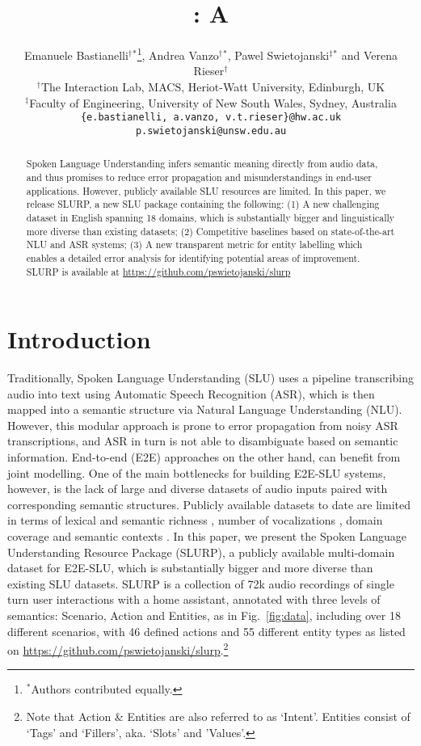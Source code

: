 \documentclass[11pt,a4paper]{article}
\title{\datasetacr: A \datasetname}
\author{Emanuele Bastianelli$^{\dagger}$$^*$\thanks{$^*$Authors contributed equally.}, 
  Andrea Vanzo$^{\dagger}$$^*$, 
  Pawel Swietojanski$^{\ddagger}$$^*$ and Verena Rieser$^\dagger$ \\
  $^\dagger$The Interaction Lab, MACS, Heriot-Watt University, Edinburgh, UK \\
  $^\ddagger$Faculty of Engineering, University of New South Wales, Sydney, Australia \\
  {\tt \{e.bastianelli, a.vanzo, v.t.rieser\}@hw.ac.uk} \\
  {\tt p.swietojanski@unsw.edu.au} \\
  }
\date{}
\newcommand{\datasetacr}{SLURP}
\newcommand{\datasetname}{Spoken Language Understanding Resource Package}
\newcommand{\etoe}{E2E}
\newcommand{\slu}{SLU}
\newcommand{\asr}{ASR}
\newcommand{\nlu}{NLU}
\newcommand{\datasetwholek}{72k}
\newcommand{\scenarion}{18}
\newcommand{\actionn}{46}
\newcommand{\entityn}{55}
\begin{document}
\maketitle
\begin{abstract}
Spoken Language Understanding infers semantic meaning directly from audio data, and thus promises to reduce error propagation and misunderstandings in end-user applications. However, publicly available SLU resources are limited. In this paper, we release \datasetacr, a new SLU package  containing the following: (1) A new challenging dataset in English spanning \scenarion{} domains, which is substantially bigger and linguistically more diverse than existing datasets; (2) Competitive baselines based on state-of-the-art NLU and ASR systems; (3)  A new transparent metric for entity labelling which enables a detailed error analysis for identifying potential areas of improvement. \datasetacr{} is available at \url{https://github.com/pswietojanski/slurp}
\end{abstract}
\section{Introduction}


Traditionally, Spoken Language Understanding (\slu) 
uses a pipeline transcribing audio into text using Automatic Speech Recognition (\asr), which is then mapped
into a semantic structure via Natural Language Understanding (\nlu). 
However, this modular approach is prone to error propagation from noisy \asr{} transcriptions, and \asr{} in turn is not able to disambiguate based on semantic information. End-to-end (\etoe) approaches on the other hand, can benefit from joint modelling.
One of the main bottlenecks for building \etoe-\slu{} systems, however, is the lack of large and diverse datasets
of audio inputs paired with corresponding semantic structures. Publicly available datasets to date are limited in terms of lexical and semantic richness \cite{lugosh19:Interspeech}, number of vocalizations \cite{Coucke18:Snips}, domain coverage \cite{Hemphill90:ATIS, Dahl:94ATIS} and semantic contexts \cite{Godfrey92:switchboard, Jurafsky1997:DASwitchboard}. 
In this paper, we present the \datasetname{} (\datasetacr), a publicly available multi-domain dataset for \etoe-\slu{}, which is substantially bigger and more diverse than existing SLU datasets. \datasetacr{} is a collection of \texttildelow\datasetwholek{} audio recordings of single turn user interactions with a home assistant, annotated with three levels of semantics:  Scenario, Action and Entities, as in Fig.\ \ref{fig:data}, including over \scenarion{} different scenarios, with \actionn{} defined actions and \entityn{} different entity types as listed on \url{https://github.com/pswietojanski/slurp}.\footnote{Note that Action \& Entities are also referred to as `Intent'. Entities consist of `Tags' and  `Fillers', aka. `Slots' and 'Values'.}
\end{document}
